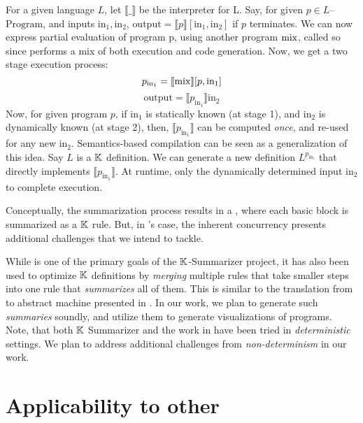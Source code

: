 For a given language $L$, let $\llbracket\_\rrbracket$ be the
interpreter for L. Say, for given $p \in L$--$\text{Program}$, and inputs
$\text{in}_1, \text{in}_2$,
$\text{output} = \llbracket p \rrbracket\left[\text{in}_1,\text{in}_2\right]$
if $p$ terminates.
We can now express partial evaluation of program p, using another
program $\text{mix}$, called so since performs a mix of both execution and code
generation. Now, we get a two stage execution process:
$$ p_{\text{in}_1} = \llbracket \text{mix} \rrbracket [p, \text{in}_1]$$
$$ \text{output} = \llbracket p_{\text{in}_1} \rrbracket \text{in}_2$$
Now, for given program $p$, if $\text{in}_1$ is statically known (at stage 1),
and $\text{in}_2$ is dynamically known (at stage 2), then,
$\llbracket p_{\text{in}_1} \rrbracket$ can be computed \emph{once}, and
re-used for any new $\text{in}_2$.
Semantics-based compilation can be seen as a generalization of this idea.
Say $L$ is a $\mathbb{K}$ definition. We can generate a new definition
$L^{p_{\text{in}_1}}$ that directly implements $\llbracket p_{\text{in}_1}
\rrbracket$. At runtime, only the dynamically determined input $\text{in}_2$
to complete execution.

Conceptually, the summarization process results in a \CFG{}, where
each basic block is summarized as a $\mathbb{K}$ rule. But, in \MediK{}'s
case, the inherent concurrency presents additional challenges
that we intend to tackle.

While \SBC{} is one of the primary goals of the $\mathbb{K}{}$-Summarizer
project, it has also been used to optimize $\mathbb{K}$ definitions
by \emph{merging} multiple rules that take smaller steps into
one rule that \emph{summarizes} all of them. This is similar
to the translation from \SOS{} to abstract machine presented in
\cite{KoppelICFP22}. In our work, we plan to generate such
\emph{summaries} soundly, and utilize them to generate visualizations
of \MediK{} programs. Note, that both $\mathbb{K}$ Summarizer and the work
in \cite{KoppelICFP22} have been tried in \emph{deterministic} settings.
We plan to address additional challenges from \emph{non-determinism} in our
work.

\section{Applicability to other \CDSSs{}}\label{subsec:applicability}


